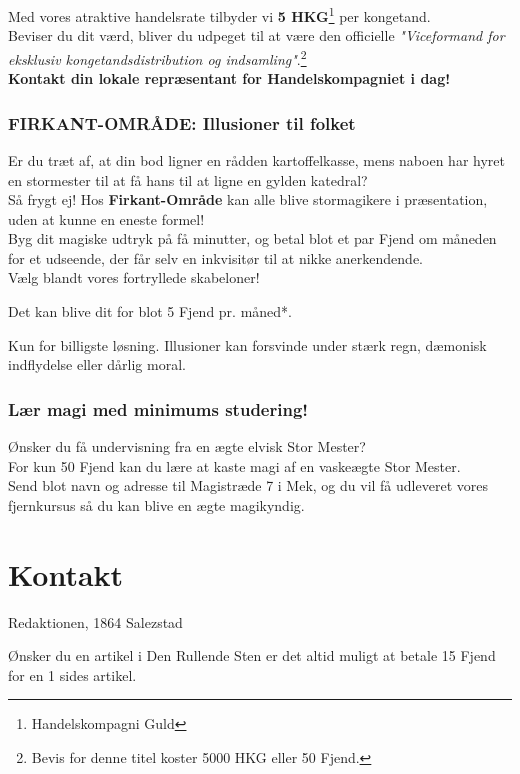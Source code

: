 \documentclass[letterpaper,12pt]{memoir}
\newcommand{\separator}{%
  \par\noindent{\color{black!40}\rule{\textwidth}{0.4pt}}\par
}
\begin{document}
Med vores atraktive handelsrate tilbyder vi \textbf{5 HKG}\footnote{Handelskompagni Guld} per kongetand. \\[0.5em]

Beviser du dit værd, bliver du udpeget til at være den officielle \textit{"Viceformand for eksklusiv kongetandsdistribution og indsamling"}.\footnote{Bevis for denne titel koster 5000 HKG eller 50 Fjend.} \\[1em]

\textbf{Kontakt din lokale repræsentant for Handelskompagniet i dag!}


\subsubsection*{FIRKANT-OMRÅDE: Illusioner til folket}
Er du træt af, at din bod ligner en rådden kartoffelkasse, mens naboen har hyret en stormester til at få hans til at ligne en gylden katedral?\\
Så frygt ej! Hos \textbf{Firkant-Område} kan alle blive stormagikere i præsentation, uden at kunne en eneste formel!\\[1ex]

Byg dit magiske udtryk på få minutter, og betal blot et par Fjend om måneden for et udseende, der får selv en inkvisitør til at nikke anerkendende.\\

\noindent Vælg blandt vores fortryllede skabeloner!

Det kan blive dit for blot 5 Fjend pr. måned*.

{\small *Kun for billigste løsning. Illusioner kan forsvinde under stærk regn, dæmonisk indflydelse eller dårlig moral.}

\subsubsection*{Lær magi med minimums studering!}
Ønsker du få undervisning fra en ægte elvisk Stor Mester? \\
For kun 50 Fjend kan du lære at kaste magi af en vaskeægte Stor Mester.\\
Send blot navn og adresse til Magistræde 7 i Mek, og du vil få udleveret vores fjernkursus så du kan blive en ægte magikyndig.


\separator

\section*{Kontakt}
Redaktionen, 1864 Salezstad

Ønsker du en artikel i Den Rullende Sten er det altid muligt at betale 15 Fjend for en 1 sides artikel.
\end{document}
